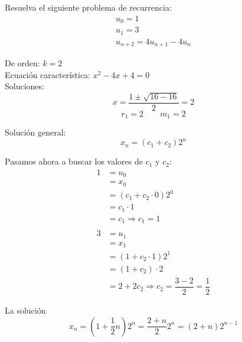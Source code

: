 \begin{ejercicio}
    Resuelva el siguiente problema de recurrencia:
    \begin{gather*}
        u_0 = 1 \\
        u_1 = 3 \\
        u_{n+2} = 4u_{n+1} - 4u_n
    \end{gather*}


    De orden: $k = 2$\\
    Ecuación característica: $x^2 -4x + 4 = 0$\\
    Soluciones: 
    \begin{equation*}
        x = \dfrac{1\pm \sqrt{16-16}}{2} = 2
    \end{equation*}
    \begin{equation*}
        r_1 = 2 \qquad m_1 = 2
    \end{equation*}

    Solución general:
    \begin{equation*}
        x_n = (c_1 + c_2) 2^n
    \end{equation*}


    Pasamos ahora a buscar los valores de $c_1$ y $c_2$:
    \begin{align*}
        1 &= u_0 \\
          &= x_0 \\
          &= (c_1+c_2 \cdot 0)2^0 \\
          &= c_1 \cdot 1  \\
          &= c_1 \Longrightarrow c_1 = 1\\
          & \\
        3 &= u_1 \\
          &= x_1 \\
          &= (1+c_2\cdot 1)2^1 \\
          &= (1+c_2)\cdot 2 \\
          &= 2 + 2 c_2 \Longrightarrow c_2 = \dfrac{3-2}{2} = \dfrac{1}{2}
    \end{align*}

    La solución
    \begin{equation*}
        x_n = \left(1 + \dfrac{1}{2}n\right) 2^n = \dfrac{2+n}{2} 2^n = (2+n)2^{n-1}
    \end{equation*}

\end{ejercicio}

